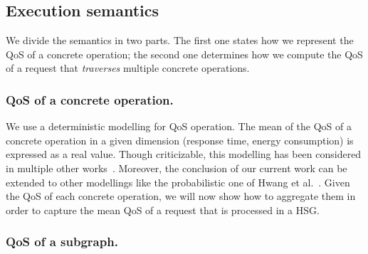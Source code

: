 \documentclass[a4paper]{article}
\begin{document}
\subsection{Execution semantics}

We divide the semantics in two parts. The first one states how we represent the QoS of a concrete 
operation; the second one determines how we compute the QoS of a request that {\it traverses} multiple 
concrete operations.

\subsubsection{QoS of a concrete operation.}

We use a deterministic modelling for QoS operation. The mean of the QoS of a concrete 
operation in a given dimension (response time, energy consumption) is expressed as a real value. 
Though criticizable, this modelling has been considered in multiple other works~\cite{Cardoso2004281,ZengMiddleware,GoldmanNgoko}. 
Moreover, the conclusion of our current work can be extended to other modellings like the  
probabilistic one  of Hwang et al.~\cite{Hwang20075484}. Given the QoS of each concrete operation, we will now show how to 
aggregate them in order to capture the mean QoS of a request that is processed in a HSG. 


\subsubsection{QoS of a subgraph.}
\end{document}
